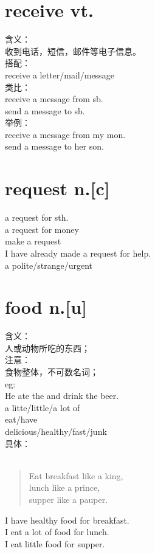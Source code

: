 \documentclass[twocolumn]{ctexbook}
\newcommand{\phrase}[1]{{\colorbox{yellow!40}{#1}}}
\newcommand{\point}[1]{{\color{red}#1}}
\newcommand{\word}[1]{{\em\color{black}{#1}}}
\begin{document}
	\section{receive vt.}
	含义：\\
	收到电话，短信，邮件等{\point{电子信息}}。\\
	搭配：\\
	{\point{receive}} a letter/mail/message\\
	类比：\\
	{\point{receive}} a message {\point{from}} sb.\\
	{\point{send}} a message {\point{to}} sb.\\
	举例：\\
	receive a message from my mon.\\
	send a message to her son.\\
	\section{request n.[c]}
	{\phrase{a request for sth.}}\\
	a request for money\\
	{\phrase{make a request}}\\
	I have already made a request for help.\\
	{\phrase{a \point{polite/strange/urgent} \word{request}}}\\
	\section{food n.[u]}
	含义：\\
	人或动物所吃的东西；\\
	注意：\\
	食物整体，不可数名词；\\
	eg:\\
	He ate the {\word{food}} and drink the beer.\\
	{\phrase{a litte/little/a lot of}\word{food}}\\
	{\phrase{eat/have }\word{food}}\\
	{\phrase{delicious/healthy/fast/junk}\word{food}}\\
	具体：\\
	{\word{breakfast/lunch/supper/dinner}}\\
	\begin{quote}
		Eat breakfast like a king,\\
		lunch like a prince,\\
		supper like a pauper.\\
	\end{quote}
	I have healthy food for breakfast.\\
	I eat a lot of food for lunch.\\
	I eat little food for supper.\\
\end{document}

